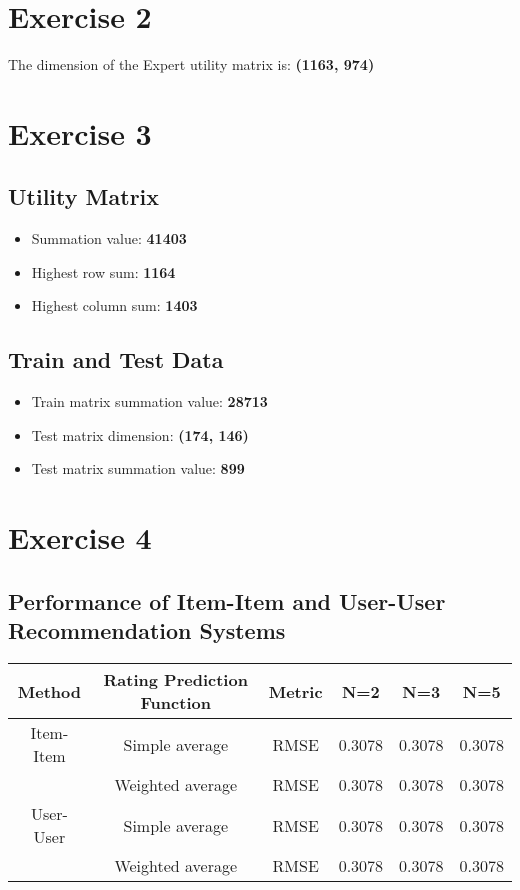 \documentclass[12pt]{article}
\begin{document}
\section*{Exercise 2}
The dimension of the Expert utility matrix is: \textbf{(1163, 974)}

\section*{Exercise 3}

\subsection*{Utility Matrix}
\begin{itemize}
    \item Summation value: \textbf{41403}
    \item Highest row sum: \textbf{1164}
    \item Highest column sum: \textbf{1403}
\end{itemize}

\subsection*{Train and Test Data}
\begin{itemize}
    \item Train matrix summation value: \textbf{28713}
    \item Test matrix dimension: \textbf{(174, 146)}
    \item Test matrix summation value: \textbf{899}
\end{itemize}

\section*{Exercise 4}

\subsection*{Performance of Item-Item and User-User Recommendation Systems}

\begin{center}
\begin{tabular}{|c|c|c|c|c|c|}
\hline
Method & Rating Prediction Function & Metric & N=2 & N=3 & N=5\\
\hline
Item-Item & Simple average & RMSE & 0.3078 & 0.3078 & 0.3078 \\
\hline
 & Weighted average & RMSE & 0.3078 & 0.3078 & 0.3078 \\
\hline
User-User & Simple average & RMSE & 0.3078 & 0.3078 & 0.3078 \\
\hline
 & Weighted average & RMSE & 0.3078 & 0.3078 & 0.3078 \\
\hline
\end{tabular}
\end{center}
\end{document}
